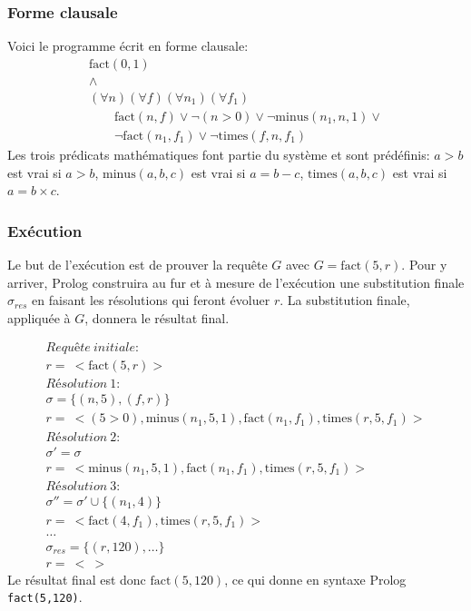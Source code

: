 \subsubsection{Forme clausale}
Voici le programme écrit en forme clausale:
\begin{equation}
\begin{array}{l}
\mathrm{fact}(0,1) \\
\wedge \\
(\forall n) (\forall f) (\forall n_1) (\forall f_1) \\
\quad \quad \mathrm{fact}(n,f) \vee \neg(n>0) \vee \neg \mathrm{minus}(n_1,n,1) \vee \\
\quad \quad \neg \mathrm{fact}(n_1,f_1) \vee \neg \mathrm{times}(f,n,f_1)
\end{array}
\end{equation}
Les trois prédicats mathématiques font partie du système et sont prédéfinis:
$a>b$ est vrai si $a>b$,
$\mathrm{minus}(a,b,c)$ est vrai si $a=b-c$,
$\mathrm{times}(a,b,c)$ est vrai si $a=b \times c$.

\subsubsection{Exécution} 

Le but de l'exécution est de prouver la requête $G$ avec $G = \mathrm{fact}(5, r)$.
Pour y arriver, Prolog construira au fur et à mesure de l'exécution
une substitution finale $\sigma_{res}$ en faisant les résolutions qui feront évoluer $r$.
La substitution finale, appliquée à $G$, donnera le résultat final.

\begin{equation}
\begin{array}{l}
\mathit{Requête\ initiale:}\\
r =\ < \mathrm{fact}(5, r) > \\
\mathit{Résolution\ 1:} \\
\sigma = \{ (n, 5), (f, r) \} \\
r =\ < (5>0), \mathrm{minus}(n_1, 5, 1), \mathrm{fact}(n_1, f_1), \mathrm{times}(r, 5, f_1) > \\
\mathit{Résolution\ 2:} \\
\sigma'=\sigma \\
r =\ < \mathrm{minus}(n_1, 5, 1), \mathrm{fact}(n_1, f_1), \mathrm{times}(r, 5, f_1) > \\
\mathit{Résolution\ 3:} \\
\sigma''= \sigma' \cup \{ (n_1, 4) \} \\
r =\ < \mathrm{fact}(4, f_1), \mathrm{times}(r, 5, f_1) > \\
\ldots \\
\sigma_{res} = \{(r,120), \ldots\} \\
r =\ <\ >
\end{array}
\end{equation}
Le résultat final est donc $\mathrm{fact}(5, 120)$, ce qui donne en syntaxe Prolog \verb+fact(5,120)+.

